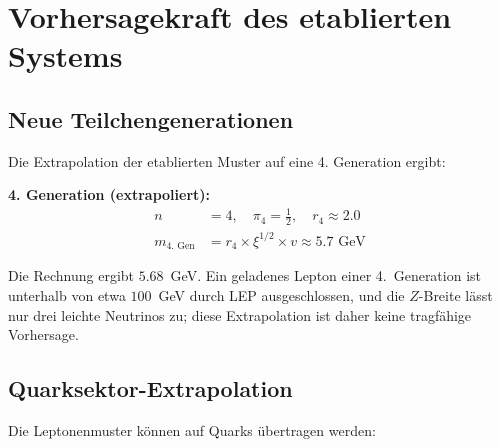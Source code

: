 \section{Vorhersagekraft des etablierten Systems}
\label{sec:predictive_power}

\subsection{Neue Teilchengenerationen}
\label{subsec:new_generations}

Die Extrapolation der etablierten Muster auf eine 4. Generation ergibt:

\textbf{4. Generation (extrapoliert):}
\begin{align}
	n &= 4, \quad \pi_4 = \frac{1}{2}, \quad r_4 \approx 2.0 \\
	m_{\text{4. Gen}} &= r_4 \times \xi^{1/2} \times v \approx 5.7 \text{ GeV}
\end{align}

Die Rechnung ergibt $5.68$~GeV. Ein geladenes Lepton einer 4.~Generation ist unterhalb von etwa $100$~GeV durch LEP ausgeschlossen, und die $Z$-Breite lässt nur drei leichte Neutrinos zu; diese Extrapolation ist daher keine tragfähige Vorhersage.

\subsection{Quarksektor-Extrapolation}
\label{subsec:quark_extrapolation}

Die Leptonenmuster können auf Quarks übertragen werden:

\begin{table}[H]
	\centering


	\caption{Quark-Vorhersagen aus etablierten Mustern}
	\label{tab:quark_predictions}
\end{table}

